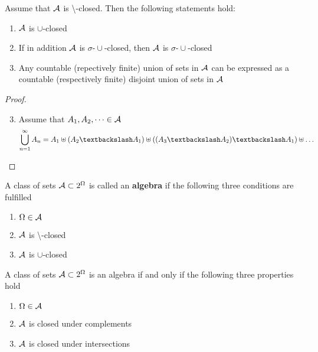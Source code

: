 \documentclass[11pt]{article}
\begin{document}
\begin{theorem}[]
\label{thm1.4}
Assume that \(\mathcal{A}\) is \textbackslash-closed. Then the following statements hold:
\begin{enumerate}
\item \(\mathcal{A}\) is \(\cup\)-closed
\item If in addition \(\mathcal{A}\) is \(\sigma\text{-}\cup\)-closed, then \(\mathcal{A}\) is 
\(\sigma\text{-}\cup\)-closed
\item Any countable (repectively finite) union of sets in \(\mathcal{A}\) can be
expressed as a countable (respectively finite) disjoint union of sets in \(\mathcal{A}\)
\end{enumerate}
\end{theorem}

\begin{proof}
\begin{enumerate}
\setcounter{enumi}{2}
\item Assume that \(A_1,A_2,\dots\in\mathcal{A}\)
\begin{equation*}
\displaystyle\bigcup_{n=1}^\infty A_n=A_1\uplus(A_2\textbackslash
A_1)\uplus((A_3\textbackslash
A_2)\textbackslash A_1)\uplus\dots
\end{equation*}
\end{enumerate}
\end{proof}

\begin{definition}[]
A class of sets \(\mathcal{A}\subset 2^\Omega\) is called an \textbf{algebra} if the
following three conditions are fulfilled
\begin{enumerate}
\item \(\Omega\in\mathcal{A}\)
\item \(\mathcal{A}\) is \textbackslash-closed
\item \(\mathcal{A}\) is \(\cup\)-closed
\end{enumerate}
\end{definition}

\begin{theorem}[]
A class of sets \(\mathcal{A}\subset2^\Omega\) is an algebra if and only if the
following  three properties hold
\begin{enumerate}
\item \(\Omega\in\mathcal{A}\)
\item \(\mathcal{A}\) is closed under complements
\item \(\mathcal{A}\) is closed under intersections
\end{enumerate}
\end{theorem}
\end{document}
